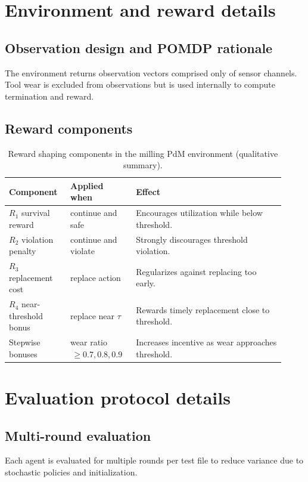 \documentclass[refree,sn-basic]{sn-jnl} %
\begin{document}
\begin{appendices}

\section{Environment and reward details}
\label{app:env_reward}
\subsection{Observation design and POMDP rationale}
The environment returns observation vectors comprised only of sensor channels. Tool wear is excluded from observations but is used internally to compute termination and reward.

\subsection{Reward components}
\begin{table}[t]
        \centering
        \caption{Reward shaping components in the milling PdM environment (qualitative summary).}
        \label{tab:reward_components}
        \begin{tabular}{p{0.20\linewidth} p{0.22\linewidth} p{0.50\linewidth}}
                \toprule
                \textbf{Component} & \textbf{Applied when} & \textbf{Effect}\\
                \midrule
                $R_1$ survival reward & continue and safe & Encourages utilization while below threshold.\\
                $R_2$ violation penalty & continue and violate & Strongly discourages threshold violation.\\
                $R_3$ replacement cost & replace action & Regularizes against replacing too early.\\
                $R_4$ near-threshold bonus & replace near $\tau$ & Rewards timely replacement close to threshold.\\
                Stepwise bonuses & wear ratio $\,\ge 0.7, 0.8, 0.9$ & Increases incentive as wear approaches threshold.\\
                \bottomrule
        \end{tabular}
\end{table}

\section{Evaluation protocol details}
\label{app:eval}
\subsection{Multi-round evaluation}
Each agent is evaluated for multiple rounds per test file to reduce variance due to stochastic policies and initialization.


\end{appendices}
\end{document}
